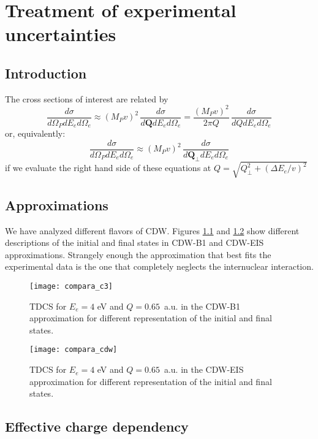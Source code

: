 
\chapter{Treatment of experimental uncertainties}
\label{C:treatm-exper-uncert}


\section{Introduction}\label{S:Intro}

The cross sections of interest are related by
\[
\frac{d \sigma}{d \Omega_{P} d E_{e} d \Omega_{e}} \approx (M_{P} v)^{2} \,\frac{d \sigma}{d \bm{Q} d E_{e} d \Omega_{e}} = \frac{(M_{P} v)^{2}}{2 \pi Q} \,\frac{d \sigma}{d Q d E_{e} d \Omega_{e}}
\]
%
or, equivalently:
%
\[
\frac{d \sigma}{d \Omega_{P} d E_{e} d \Omega_{e}} \approx (M_{P} v)^{2} \,\frac{d \sigma}{d \bm{Q}_{\perp} d E_{e} d \Omega_{e}} 
\]
if we evaluate the right hand side of these equations at $Q= \sqrt{Q_{\perp}^{2}+ (\Delta E_{e}/v)^{2}}$

\section{Approximations}
\label{S:approx}

We have analyzed different flavors of CDW. Figures \ref{F:comparac3} and \ref{F:comparacdw} show different descriptions of the initial and final states in CDW-B1 and CDW-EIS approximations. Strangely enough the approximation that best fits the experimental data is the one that completely neglects the internuclear interaction. 

\begin{figure}[!htpb]
  \label{F:comparac3}
  \centering
\texttt{[image: compara\_c3]}
  \caption{TDCS for $E_{e}=4$ eV and $Q=0.65$~a.u. in the CDW-B1 approximation for different representation of the initial and final states.}
\end{figure}

\begin{figure}[!htpb]
  \label{F:comparacdw}
  \centering
\texttt{[image: compara\_cdw]}
  \caption{TDCS for $E_{e}=4$ eV and $Q=0.65$~a.u. in the CDW-EIS approximation for different representation of the initial and final states.}
\end{figure}

\section{Effective charge dependency}
\label{S:effec-charg-depen}


